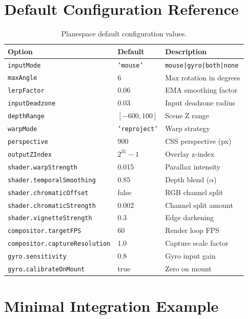 \documentclass[10pt,twocolumn]{article}
\begin{document}
\appendix

\section{Default Configuration Reference}
\label{app:config}

\begin{table}[h]
\centering
\caption{Planespace default configuration values.}
\label{tab:config}
\begin{tabular}{lll}
\toprule
Option & Default & Description \\
\midrule
\texttt{inputMode} & \texttt{'mouse'} & \texttt{mouse|gyro|both|none} \\
\texttt{maxAngle} & 6 & Max rotation in degrees \\
\texttt{lerpFactor} & 0.06 & EMA smoothing factor \\
\texttt{inputDeadzone} & 0.03 & Input deadzone radius \\
\texttt{depthRange} & $[-600, 100]$ & Scene Z range \\
\texttt{warpMode} & \texttt{'reproject'} & Warp strategy \\
\texttt{perspective} & 900 & CSS perspective (px) \\
\texttt{outputZIndex} & $2^{31}-1$ & Overlay z-index \\
\texttt{shader.warpStrength} & 0.015 & Parallax intensity \\
\texttt{shader.temporalSmoothing} & 0.85 & Depth blend ($\alpha$) \\
\texttt{shader.chromaticOffset} & false & RGB channel split \\
\texttt{shader.chromaticStrength} & 0.002 & Channel split amount \\
\texttt{shader.vignetteStrength} & 0.3 & Edge darkening \\
\texttt{compositor.targetFPS} & 60 & Render loop FPS \\
\texttt{compositor.captureResolution} & 1.0 & Capture scale factor \\
\texttt{gyro.sensitivity} & 0.8 & Gyro input gain \\
\texttt{gyro.calibrateOnMount} & true & Zero on mount \\
\bottomrule
\end{tabular}
\end{table}

\section{Minimal Integration Example}
\label{app:quickstart}
\end{document}
